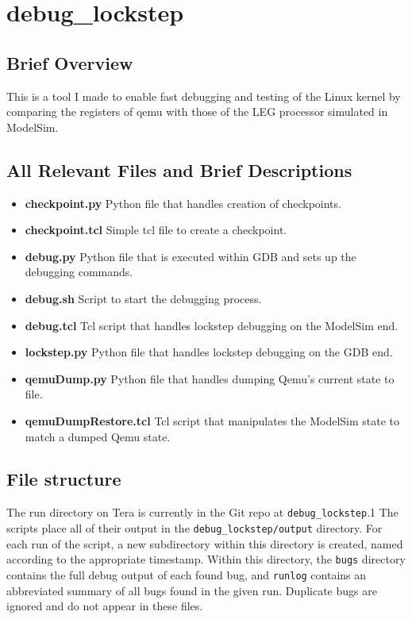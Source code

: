 \section{debug\_lockstep}

\subsection{Brief Overview}

This is a tool I made to enable fast debugging and testing of the Linux kernel by comparing the registers of qemu with those of the LEG processor simulated in ModelSim.

\subsection{All Relevant Files and Brief Descriptions}

\begin{itemize}
\item \textbf{checkpoint.py} Python file that handles creation of checkpoints.
\item \textbf{checkpoint.tcl} Simple tcl file to create a checkpoint.
\item \textbf{debug.py} Python file that is executed within GDB and sets up the debugging commands.
\item \textbf{debug.sh} Script to start the debugging process.
\item \textbf{debug.tcl} Tcl script that handles lockstep debugging on the ModelSim end.
\item \textbf{lockstep.py} Python file that handles lockstep debugging on the GDB end.
\item \textbf{qemuDump.py} Python file that handles dumping Qemu's current state to file.
\item \textbf{qemuDumpRestore.tcl} Tcl script that manipulates the ModelSim state to match a dumped Qemu state.
\end{itemize}

\subsection{File structure}
The run directory on Tera is currently in the Git repo at \texttt{debug\_lockstep}.1 The scripts place all of their output in the \texttt{debug\_lockstep/output} directory. For each run of the script, a new subdirectory within this directory is created, named according to the appropriate timestamp. Within this directory, the \texttt{bugs} directory contains the full debug output of each found bug, and \texttt{runlog} contains an abbreviated summary of all bugs found in the given run. Duplicate bugs are ignored and do not appear in these files.

